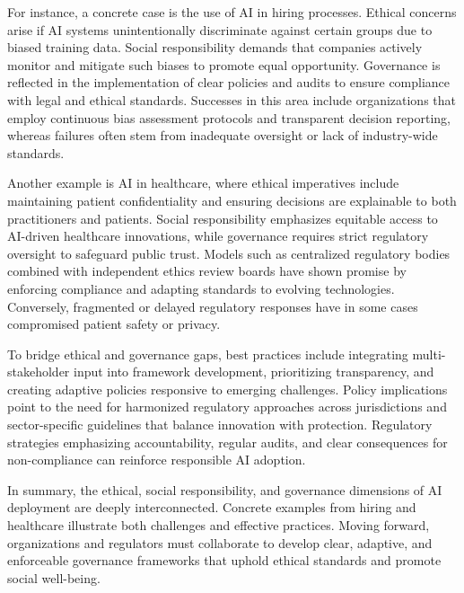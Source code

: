 \documentclass[sigconf]{acmart}
\begin{document}
For instance, a concrete case is the use of AI in hiring processes. Ethical concerns arise if AI systems unintentionally discriminate against certain groups due to biased training data. Social responsibility demands that companies actively monitor and mitigate such biases to promote equal opportunity. Governance is reflected in the implementation of clear policies and audits to ensure compliance with legal and ethical standards. Successes in this area include organizations that employ continuous bias assessment protocols and transparent decision reporting, whereas failures often stem from inadequate oversight or lack of industry-wide standards.

Another example is AI in healthcare, where ethical imperatives include maintaining patient confidentiality and ensuring decisions are explainable to both practitioners and patients. Social responsibility emphasizes equitable access to AI-driven healthcare innovations, while governance requires strict regulatory oversight to safeguard public trust. Models such as centralized regulatory bodies combined with independent ethics review boards have shown promise by enforcing compliance and adapting standards to evolving technologies. Conversely, fragmented or delayed regulatory responses have in some cases compromised patient safety or privacy.

To bridge ethical and governance gaps, best practices include integrating multi-stakeholder input into framework development, prioritizing transparency, and creating adaptive policies responsive to emerging challenges. Policy implications point to the need for harmonized regulatory approaches across jurisdictions and sector-specific guidelines that balance innovation with protection. Regulatory strategies emphasizing accountability, regular audits, and clear consequences for non-compliance can reinforce responsible AI adoption.

In summary, the ethical, social responsibility, and governance dimensions of AI deployment are deeply interconnected. Concrete examples from hiring and healthcare illustrate both challenges and effective practices. Moving forward, organizations and regulators must collaborate to develop clear, adaptive, and enforceable governance frameworks that uphold ethical standards and promote social well-being.
\end{document}
